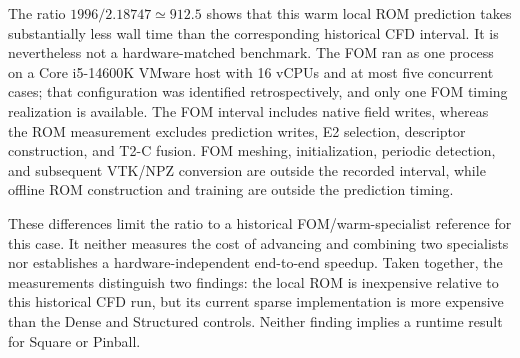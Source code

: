 The ratio $1996/2.18747\simeq912.5$ shows that this warm local ROM
prediction takes substantially less wall time than the corresponding
historical CFD interval. It is nevertheless not a hardware-matched
benchmark. The FOM ran as one process on a Core i5-14600K VMware host
with 16 vCPUs and at most five concurrent cases; that configuration
was identified retrospectively, and only one FOM timing realization
is available. The FOM interval includes native field writes, whereas
the ROM measurement excludes prediction writes, E2 selection,
descriptor construction, and T2-C fusion. FOM meshing, initialization,
periodic detection, and subsequent VTK/NPZ conversion are outside the
recorded interval, while offline ROM construction and training are
outside the prediction timing.

These differences limit the ratio to a historical FOM/warm-specialist
reference for this case. It neither measures the cost of advancing and
combining two specialists nor establishes a hardware-independent
end-to-end speedup. Taken together, the measurements distinguish two
findings: the local ROM is inexpensive relative to this historical CFD
run, but its current sparse implementation is more expensive than the
Dense and Structured controls. Neither finding implies a runtime result
for Square or Pinball.
